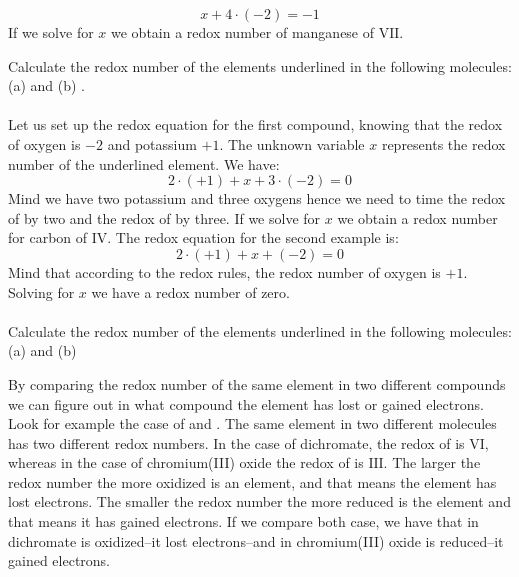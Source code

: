 \documentclass[main.tex]{subfiles}
\begin{document}
\begin{description}
\begin{description}
\[x+4\cdot (-2)=-1\]
If we solve for $x$ we obtain a redox number of manganese of $\text{VII}$.
\begin{example} %
Calculate the redox number of the elements underlined in the following molecules: (a)  and (b) .
\\
\\
Let us set up the redox equation for the first compound, knowing that the redox of oxygen is $-2$ and potassium $+1$. The unknown variable $x$ represents the redox number of the underlined element. We have:
\[2\cdot (+1)+x+3\cdot (-2)=0\]
Mind we have two potassium and three oxygens hence we need to time the redox of  by two and the redox of  by three. If we solve for $x$ we obtain a redox number for carbon of $\text{IV}$. The redox equation for the second example is:
\[2\cdot (+1) + x+ (-2)=0\]
Mind that according to the redox rules, the redox number of oxygen is $+1$. Solving for $x$ we have a redox number of zero.
\\
\faDiamond\ \\
Calculate the redox number of the elements underlined in the following molecules: (a)  and (b)  
  \\
\end{example}%
\end{description}



\item[\docfilehook{Redox means oxidation and reduction}{}] By comparing the redox number of the same element in two different compounds we can figure out in what compound the element has lost or gained electrons. Look for example the case of  and  . The same element in two different molecules has two different redox numbers. In the case of dichromate, the redox of  is  $\text{VI}$, whereas in the case of chromium(III) oxide the redox of  is $\text{III}$. The larger the redox number the more oxidized is an element, and that means the element has lost electrons. The smaller the redox number the more reduced is the element and that means it has gained electrons. If we compare both case, we have that  in dichromate is oxidized--it lost electrons--and  in chromium(III) oxide is reduced--it gained electrons.


\end{description}
\end{document}
